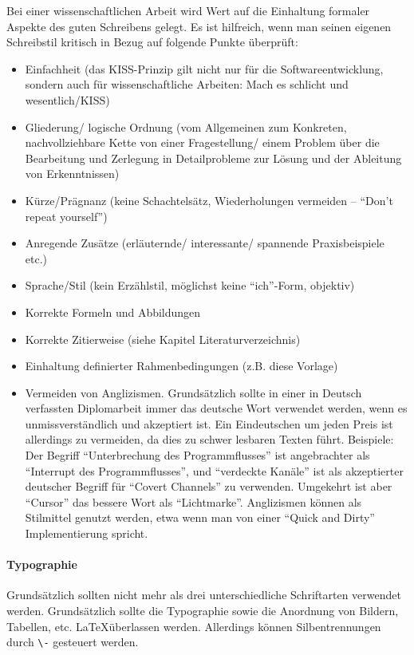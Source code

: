 Bei einer wissenschaftlichen Arbeit wird Wert auf die Einhaltung formaler Aspekte des guten Schreibens gelegt. Es ist hilfreich, wenn man seinen eigenen Schreibstil kritisch in Bezug auf folgende Punkte überprüft:
\begin{itemize}
	\item Einfachheit (das \ac{KISS}-Prinzip gilt nicht nur für die Softwareentwicklung, sondern auch für wissenschaftliche Arbeiten: Mach es schlicht und wesentlich/\acl{KISS})
	\item Gliederung/ logische Ordnung (vom Allgemeinen zum Konkreten, nachvollziehbare Kette von einer Fragestellung/ einem Problem über die Bearbeitung und Zerlegung in Detailprobleme zur Lösung und der Ableitung von Erkenntnissen)
	\item Kürze/Prägnanz (keine Schachtelsätz, Wiederholungen vermeiden – \enquote{Don't repeat yourself})
	\item Anregende Zusätze (erläuternde/ interessante/ spannende Praxisbeispiele etc.)
	\item Sprache/Stil (kein Erzählstil, möglichst keine \enquote{ich}-Form, objektiv)
	\item Korrekte Formeln und Abbildungen
	\item Korrekte Zitierweise (siehe Kapitel Literaturverzeichnis)
	\item Einhaltung definierter Rahmenbedingungen (z.B. diese Vorlage)
	\item Vermeiden von Anglizismen. Grundsätzlich sollte in einer in Deutsch verfassten Diplomarbeit immer das deutsche Wort verwendet werden, wenn es unmissverständlich und akzeptiert ist. Ein Eindeutschen um jeden Preis ist allerdings zu vermeiden, da dies zu schwer lesbaren Texten führt. Beispiele: Der Begriff \enquote{Unterbrechung des Programmflusses} ist angebrachter als \enquote{Interrupt des Programmflusses}, und \enquote{verdeckte Kanäle} ist als akzeptierter deutscher Begriff für \enquote{Covert Channels} zu verwenden. Umgekehrt ist aber \enquote{Cursor} das bessere Wort als \enquote{Lichtmarke}. Anglizismen können als Stilmittel genutzt werden, etwa wenn man von einer \enquote{Quick and Dirty} Implementierung spricht.
\end{itemize}

\paragraph{Typographie}
Grundsätzlich sollten nicht mehr als drei unterschiedliche Schriftarten verwendet werden. Grundsätzlich sollte die Typographie sowie die Anordnung von Bildern, Tabellen, etc. \LaTeX überlassen werden. Allerdings können Silbentrennungen durch \verb|\-| gesteuert werden.

